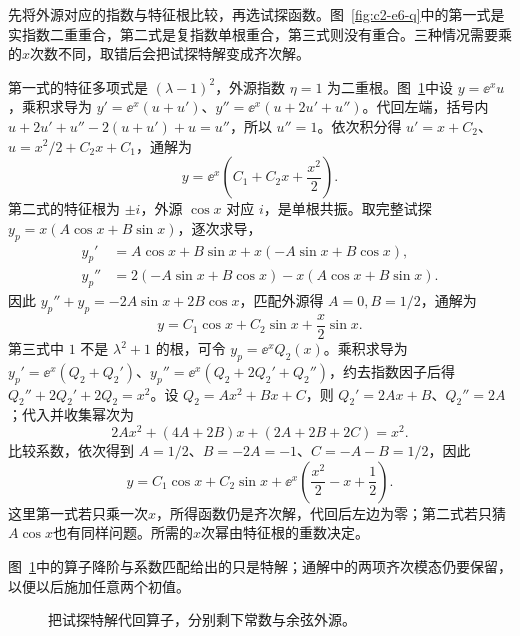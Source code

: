 \begin{solution}
先将外源对应的指数与特征根比较，再选试探函数。图~\ref{fig:c2-e6-q}中的第一式是实指数二重重合，第二式是复指数单根重合，第三式则没有重合。三种情况需要乘的$x$次数不同，取错后会把试探特解变成齐次解。


第一式的特征多项式是 $(\lambda-1)^2$，外源指数 $\eta=1$ 为二重根。图~\ref{fig:c2-e6-s}中设 $y=\ee^xu$，乘积求导为 $y'=\ee^x(u+u')$、$y''=\ee^x(u+2u'+u'')$。代回左端，括号内 $u+2u'+u''-2(u+u')+u=u''$，所以 $u''=1$。依次积分得 $u'=x+C_2$、$u=x^2/2+C_2x+C_1$，通解为
\[y=\ee^x\left(C_1+C_2x+\frac{x^2}{2}\right).
\]
第二式的特征根为 $\pm i$，外源 $\cos x$ 对应 $i$，是单根共振。取完整试探 $y_p=x(A\cos x+B\sin x)$，逐次求导，
\[
\begin{aligned}
y_p'&=A\cos x+B\sin x+x(-A\sin x+B\cos x),\\
y_p''&=2(-A\sin x+B\cos x)-x(A\cos x+B\sin x).
\end{aligned}
\]
因此 $y_p''+y_p=-2A\sin x+2B\cos x$，匹配外源得 $A=0,B=1/2$，通解为
\[y=C_1\cos x+C_2\sin x+\frac x2\sin x.
\]
第三式中 $1$ 不是 $\lambda^2+1$ 的根，可令 $y_p=\ee^xQ_2(x)$。乘积求导为 $y_p'=\ee^x(Q_2+Q_2')$、$y_p''=\ee^x(Q_2+2Q_2'+Q_2'')$，约去指数因子后得 $Q_2''+2Q_2'+2Q_2=x^2$。设 $Q_2=Ax^2+Bx+C$，则 $Q_2'=2Ax+B$、$Q_2''=2A$；代入并收集幂次为
\[
2Ax^2+(4A+2B)x+(2A+2B+2C)=x^2.
\]
比较系数，依次得到 $A=1/2$、$B=-2A=-1$、$C=-A-B=1/2$，因此
\[y=C_1\cos x+C_2\sin x+\ee^x\left(\frac{x^2}{2}-x+\frac12\right).
\]
这里第一式若只乘一次$x$，所得函数仍是齐次解，代回后左边为零；第二式若只猜$A\cos x$也有同样问题。所需的$x$次幂由特征根的重数决定。


图~\ref{fig:c2-e6-s}中的算子降阶与系数匹配给出的只是特解；通解中的两项齐次模态仍要保留，以便以后施加任意两个初值。

\begin{figure}[H]\centering
{}
\caption{把试探特解代回算子，分别剩下常数与余弦外源。}\label{fig:c2-e6-s}
\end{figure}
\end{solution}
